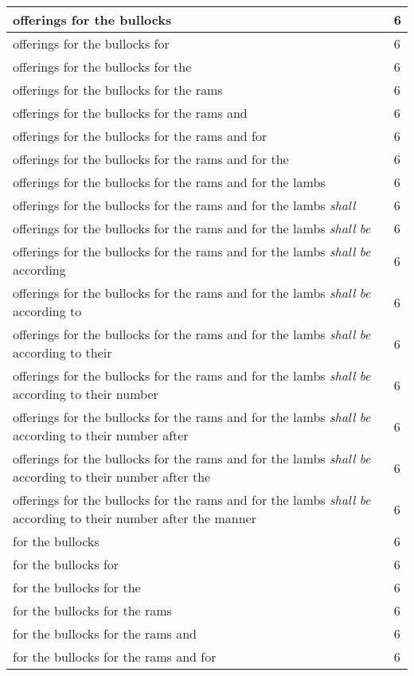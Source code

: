 \begin{center}
\begin{longtable}{|p{3.0in}|p{0.5in}|}
offerings for the bullocks & 6\\ \hline 
offerings for the bullocks for & 6\\ \hline 
offerings for the bullocks for the & 6\\ \hline 
offerings for the bullocks for the rams & 6\\ \hline 
offerings for the bullocks for the rams and & 6\\ \hline 
offerings for the bullocks for the rams and for & 6\\ \hline 
offerings for the bullocks for the rams and for the & 6\\ \hline 
offerings for the bullocks for the rams and for the lambs & 6\\ \hline 
offerings for the bullocks for the rams and for the lambs \emph{shall} & 6\\ \hline 
offerings for the bullocks for the rams and for the lambs \emph{shall} \emph{be} & 6\\ \hline 
offerings for the bullocks for the rams and for the lambs \emph{shall} \emph{be} according & 6\\ \hline 
offerings for the bullocks for the rams and for the lambs \emph{shall} \emph{be} according to & 6\\ \hline 
offerings for the bullocks for the rams and for the lambs \emph{shall} \emph{be} according to their & 6\\ \hline 
offerings for the bullocks for the rams and for the lambs \emph{shall} \emph{be} according to their number & 6\\ \hline 
offerings for the bullocks for the rams and for the lambs \emph{shall} \emph{be} according to their number after & 6\\ \hline 
offerings for the bullocks for the rams and for the lambs \emph{shall} \emph{be} according to their number after the & 6\\ \hline 
offerings for the bullocks for the rams and for the lambs \emph{shall} \emph{be} according to their number after the manner & 6\\ \hline 
for the bullocks & 6\\ \hline 
for the bullocks for & 6\\ \hline 
for the bullocks for the & 6\\ \hline 
for the bullocks for the rams & 6\\ \hline 
for the bullocks for the rams and & 6\\ \hline 
for the bullocks for the rams and for & 6\\ \hline 

\end{longtable}
\end{center}
